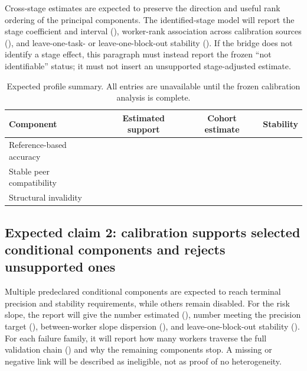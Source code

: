 \expectedresult{} Cross-stage estimates are expected to preserve the direction and useful rank ordering of the principal components. The identified-stage model will report the stage coefficient and interval (\tbddata{}), worker-rank association across calibration sources (\tbddata{}), and leave-one-task- or leave-one-block-out stability (\tbddata{}). If the bridge does not identify a stage effect, this paragraph must instead report the frozen ``not identifiable'' status; it must not insert an unsupported stage-adjusted estimate.

\begin{table}[t]
\centering
\caption{Expected profile summary. All entries are unavailable until the frozen calibration analysis is complete. \expectedresult{}}
\label{tab:expectedprofile}
\begin{tabular}{lccc}
\toprule
Component & Estimated support & Cohort estimate & Stability \\
\midrule
Reference-based accuracy & \tbddata{} & \tbddata{} & \tbddata{} \\
Stable peer compatibility & \tbddata{} & \tbddata{} & \tbddata{} \\
Structural invalidity & \tbddata{} & \tbddata{} & \tbddata{} \\
\bottomrule
\end{tabular}
\end{table}

\subsection{Expected claim 2: calibration supports selected conditional components and rejects unsupported ones \expectedresult{}}


\expectedresult{} Multiple predeclared conditional components are expected to reach terminal precision and stability requirements, while others remain disabled. For the risk slope, the report will give the number estimated (\tbddata{}), number meeting the precision target (\tbddata{}), between-worker slope dispersion (\tbddata{}), and leave-one-block-out stability (\tbddata{}). For each failure family, it will report how many workers traverse the full validation chain (\tbddata{}) and why the remaining components stop. A missing or negative link will be described as ineligible, not as proof of no heterogeneity.

